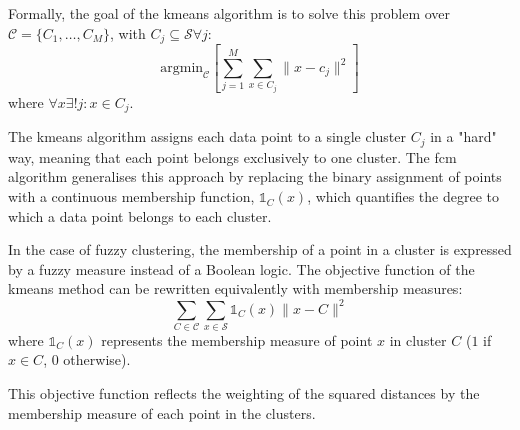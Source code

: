 	\noindent Formally, the goal of the \gls{kmeans} algorithm is to solve this problem over \\ $\mathcal{C} = \{C_1,\ldots,C_M\}$, with $C_j\subseteq\mathcal{S}\forall j$:
	\begin{equation*}
		\text{argmin}_\mathcal{C}\left[\sum_{j=1}^M\sum_{x \in C_j}\|x-c_j\|^2\right]
	\end{equation*}
	where $\forall x \exists!j : x\in C_j$.

	\noindent The \gls{kmeans} algorithm assigns each data point to a single cluster $C_j$ in a "hard" way, meaning that each point belongs exclusively to one cluster. The \gls{fcm} algorithm generalises this approach by replacing the binary assignment of points with a continuous membership function, $\mathds{1}_C(x)$, which quantifies the degree to which a data point belongs to each cluster.

	\noindent In the case of fuzzy clustering, the membership of a point in a cluster is expressed by a fuzzy measure instead of a Boolean logic. The objective function of the \gls{kmeans} method can be rewritten equivalently with membership measures:
	\begin{equation*}
		\sum_{C\in\mathcal{C}}\sum_{x \in \mathcal{S}}\mathds{1}_C(x)\|x-C\|^2
	\end{equation*}
	where $\mathds{1}_C(x)$ represents the membership measure of point $x$ in cluster $C$ ($1$ if $x\in C$, $0$ otherwise).
	\begin{modified}This objective function reflects the weighting of the squared distances by the membership measure of each point in the clusters.
	\end{modified}

